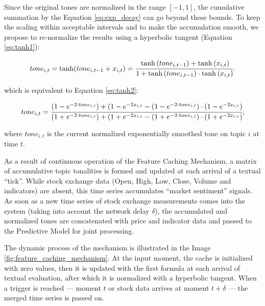Since the original tones are normalized in the range $[-1,1]$, the cumulative summation by the
Equation \ref{eq:exp_decay} can go beyond these bounds. To keep the scaling within acceptable
intervals and to make the accumulation smooth, we propose to re-normalize the results using
a hyperbolic tangent (Equation \ref{eq:tanh1}):

\begin{equation}\label{eq:tanh1}
    tone_{i, t} = \tanh(tone_{i, t-1} + x_{i,t}) =
    \cfrac{
        \tanh{(tone_{i, t-1})} + \tanh{(x_{i,t})}
    }{
        1 + \tanh{(tone_{i, t-1})} \cdot \tanh{(x_{i,t})}
    }.
\end{equation}

which is equivalent to Equation \ref{eq:tanh2}:

\begin{equation}\label{eq:tanh2}
    tone_{i, t} =
    \cfrac{
        (1-e^{-2 \cdot tone_{i, t}})+(1-e^{-2x_{i,t}} - (1-e^{-2 \cdot tone_{i, t}}) \cdot(1-e^{-2x_{i,t}})
    }{
        (1+e^{-2 \cdot tone_{i, t}})+(1+e^{-2x_{i,t}} - (1+e^{-2 \cdot tone_{i, t}}) \cdot(1+e^{-2x_{i,t}})
    },
\end{equation}

where $tone_{i, t}$ is the current normalized exponentially smoothed tone on topic $i$ at time $t$.

As a result of continuous operation of the Feature Caching Mechanism, a matrix of accumulative topic tonalities
is formed and updated at each arrival of a textual “tick”. While stock exchange data (Open, High, Low, Close,
Volume and indicators) are absent, this time series accumulates “market sentiment” signals. As soon as a new
time series of stock exchange measurements comes into the system (taking into account the network delay $\delta$),
the accumulated and normalized tones are concatenated with price and indicator data and passed to the Predictive
Model for joint processing.

The dynamic process of the mechanism is illustrated in the Image \ref{fig:feature_caching_mechanism}. At the input
moment, the cache is initialized with zero values, then it is updated with the first formula at each arrival
of textual evaluation, after which it is normalized with a hyperbolic tangent. When a trigger is reached --- moment
$t$ or stock data arrives at moment $t+\delta$ --- the merged time series is passed on.

